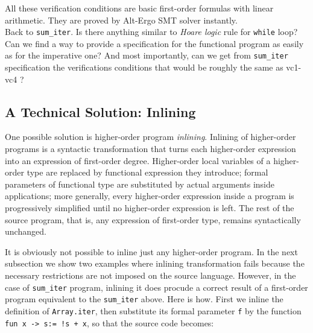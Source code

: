 \documentclass[a4paper,11pt,oneside]{article}
\theoremstyle{plain}
\begin{document}
	All these verification conditions are basic first-order formulas with linear arithmetic. 
	They are proved by Alt-Ergo SMT solver instantly. \\
	
	Back to \texttt{sum\_iter}. Is there anything similar to \textit{Hoare logic} rule for \texttt{while} loop?
	Can we find a way to provide a specification for the functional program as easily as for the imperative one? 
	And most importantly, can we get from \texttt{sum\_iter} specification the verifications conditions that would be roughly the same as vc1-vc4 ?
	
\subsection*{A Technical Solution: Inlining}
	\qquad One possible solution is higher-order program \textit{inlining}.
	Inlining of higher-order programs is a syntactic transformation that turns
each higher-order expression into an expression of first-order degree. 
	Higher-order local variables of a higher-order type are replaced by functional expression they introduce; 
	formal parameters of functional type are substituted by actual arguments inside applications; 
	more generally, every higher-order expression inside a program is progressively simplified until no higher-order expression is left. 
	The rest of the source program, that is, any expression of first-order
type, remains syntactically unchanged. 

	It is obviously not possible to inline just any higher-order program. 
	In the next subsection we show two examples where inlining transformation fails because the necessary restrictions are not imposed on the source language. 
	However, in the case of \texttt{sum\_iter} program, inlining it does procude a correct result of a first-order program equivalent to the \texttt{sum\_iter} above.
	Here is how. 
	First we inline the definition of \texttt{Array.iter}, then substitute its formal parameter \texttt{f} by the function \texttt{fun x -> s:= !s + x}, so that the source code becomes:
\end{document}
